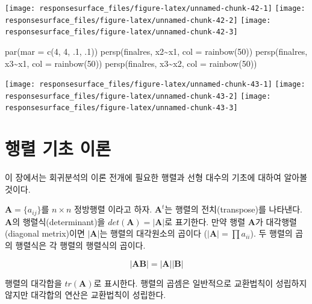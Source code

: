 \documentclass[
]{book}
\newenvironment{Shaded}{\begin{snugshade}}{\end{snugshade}}
\newcommand{\AttributeTok}[1]{\textcolor[rgb]{0.77,0.63,0.00}{#1}}
\newcommand{\DecValTok}[1]{\textcolor[rgb]{0.00,0.00,0.81}{#1}}
\newcommand{\FunctionTok}[1]{\textcolor[rgb]{0.00,0.00,0.00}{#1}}
\newcommand{\NormalTok}[1]{#1}
\newcommand{\SpecialCharTok}[1]{\textcolor[rgb]{0.00,0.00,0.00}{#1}}
\newcommand{\bm}[1]{\boldsymbol{\mathbf{#1}}}
\theoremstyle{definition}
\theoremstyle{definition}
\theoremstyle{definition}
\theoremstyle{definition}
\theoremstyle{remark}
\begin{document}
\texttt{[image: responsesurface\_files/figure-latex/unnamed-chunk-42-1]} \texttt{[image: responsesurface\_files/figure-latex/unnamed-chunk-42-2]} \texttt{[image: responsesurface\_files/figure-latex/unnamed-chunk-42-3]}

\begin{Shaded}
\begin{Highlighting}[]
\FunctionTok{par}\NormalTok{(}\AttributeTok{mar =} \FunctionTok{c}\NormalTok{(}\DecValTok{4}\NormalTok{, }\DecValTok{4}\NormalTok{, .}\DecValTok{1}\NormalTok{, .}\DecValTok{1}\NormalTok{))}
\FunctionTok{persp}\NormalTok{(finalres, x2}\SpecialCharTok{\textasciitilde{}}\NormalTok{x1, }\AttributeTok{col =} \FunctionTok{rainbow}\NormalTok{(}\DecValTok{50}\NormalTok{))}
\FunctionTok{persp}\NormalTok{(finalres, x3}\SpecialCharTok{\textasciitilde{}}\NormalTok{x1, }\AttributeTok{col =} \FunctionTok{rainbow}\NormalTok{(}\DecValTok{50}\NormalTok{))}
\FunctionTok{persp}\NormalTok{(finalres, x3}\SpecialCharTok{\textasciitilde{}}\NormalTok{x2, }\AttributeTok{col =} \FunctionTok{rainbow}\NormalTok{(}\DecValTok{50}\NormalTok{))}
\end{Highlighting}
\end{Shaded}

\texttt{[image: responsesurface\_files/figure-latex/unnamed-chunk-43-1]} \texttt{[image: responsesurface\_files/figure-latex/unnamed-chunk-43-2]} \texttt{[image: responsesurface\_files/figure-latex/unnamed-chunk-43-3]}

\hypertarget{appendix-appendix}{%
\appendix {}}


\hypertarget{matrixalgebra}{%
\chapter{행렬 기초 이론}\label{matrixalgebra}}

이 장에서는 회귀분석의 이론 전개에 필요한 행렬과 선형 대수의 기초에 대하여 알아볼 것이다.

\(\bm A = \{ a_{ij} \}\)를 \(n \times n\) 정방행렬 이라고 하자. \(\bm A^t\)는 행렬의 전치(transpose)를 나타낸다. \(\bm A\)의 행렬식(determinant)을 \(det(\bm A)=|\bm A|\)로 표기한다. 만약 행렬 \(\bm A\)가 대각행렬(diagonal metrix)이면 \(|\bm A|\)는 행렬의 대각원소의 곱이다 (\(| \bm A| =\prod a_{ii}\)). 두 행렬의 곱의 행렬식은 각 행렬의 행렬식의 곱이다.

\[ |\bm A \bm B | = | \bm A| |\bm B| \]

행렬의 대각합을 \(tr(\bm A)\)로 표시한다. 행렬의 곱셈은 일반적으로 교환법칙이 성립하지 않지만 대각합의 연산은 교환법칙이 성립한다.
\end{document}
